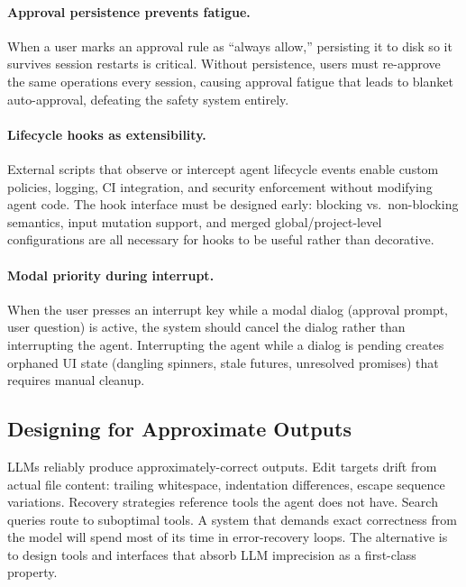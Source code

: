 \paragraph{Approval persistence prevents fatigue.} When a user marks an approval rule as ``always allow,'' persisting it to disk so it survives session restarts is critical. Without persistence, users must re-approve the same operations every session, causing approval fatigue that leads to blanket auto-approval, defeating the safety system entirely.

\paragraph{Lifecycle hooks as extensibility.} External scripts that observe or intercept agent lifecycle events enable custom policies, logging, CI integration, and security enforcement without modifying agent code. The hook interface must be designed early: blocking vs.\ non-blocking semantics, input mutation support, and merged global/project-level configurations are all necessary for hooks to be useful rather than decorative.

\paragraph{Modal priority during interrupt.} When the user presses an interrupt key while a modal dialog (approval prompt, user question) is active, the system should cancel the dialog rather than interrupting the agent. Interrupting the agent while a dialog is pending creates orphaned UI state (dangling spinners, stale futures, unresolved promises) that requires manual cleanup.

\subsection{Designing for Approximate Outputs}

LLMs reliably produce approximately-correct outputs. Edit targets drift from actual file content: trailing whitespace, indentation differences, escape sequence variations. Recovery strategies reference tools the agent does not have. Search queries route to suboptimal tools. A system that demands exact correctness from the model will spend most of its time in error-recovery loops. The alternative is to design tools and interfaces that absorb LLM imprecision as a first-class property.

